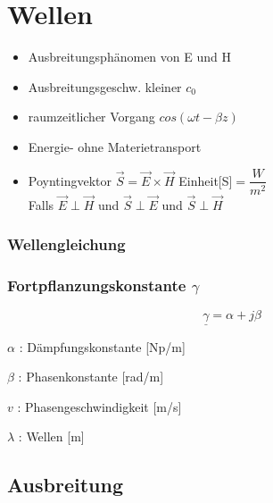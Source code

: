 \section{Wellen}
\begin{itemize}
    \setlength\itemsep{1pt}
    \item Ausbreitungsphänomen von E und H
    \item Ausbreitungsgeschw. kleiner $c_0$
    \item raumzeitlicher Vorgang $cos(\omega t- \beta z)$
    \item Energie- ohne Materietransport
    \item Poyntingvektor $\vec{S}=\vec{E}\times\vec{H}$ Einheit[S]$= \dfrac{W}{m^2}$\\
          {\footnotesize Falls $\vec{E}\perp\vec{H}$ und $\vec{S}\perp\vec{E}$ und $\vec{S}\perp\vec{H}$}
\end{itemize}

\subsubsection*{Wellengleichung}

\subsubsection*{Fortpflanzungskonstante $\gamma$}
\[\boxed{\underline{\gamma}=\alpha+j\beta}\]

$\alpha$ : Dämpfungskonstante [Np/m]

$\beta$ : Phasenkonstante [rad/m]

$v$ : Phasengeschwindigkeit [m/s]

$\lambda$ : Wellen [m]

\subsection{Ausbreitung}
